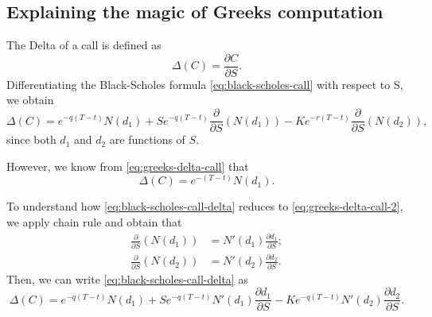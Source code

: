 \subsection{Explaining the magic of Greeks computation}

The Delta of a call is defined as
\begin{equation*}
    \Delta(C) = \frac{\partial C}{\partial S}.
\end{equation*}
Differentiating the Black-Scholes formula \eqref{eq:black-scholes-call} with
    respect to S, we obtain
\begin{equation}
    \Delta(C) = e^{-q(T-t)} N(d_1) + S e^{-q(T-t)}
    \frac{\partial}{\partial S} (N(d_1)) - K e^{-r(T-t)}
    \frac{\partial}{\partial S} (N(d_2)),
    \label{eq:black-scholes-call-delta}
\end{equation}
since both $ d_1 $ and $ d_2 $ are functions of $ S $.

However, we know from \eqref{eq:greeks-delta-call} that
\begin{equation}
    \Delta(C) = e^{-(T-t)} N(d_1).
    \label{eq:greeks-delta-call-2}
\end{equation}

To understand how \eqref{eq:black-scholes-call-delta} reduces to
    \eqref{eq:greeks-delta-call-2}, we apply chain rule and obtain that
\begin{align}
    \frac{\partial}{\partial S}(N(d_1)) &= N'(d_1)
        \frac{\partial d_1}{\partial S}; \\
    \frac{\partial}{\partial S} (N(d_2)) &= N'(d_2)
        \frac{\partial d_2}{\partial S}.
\end{align}
Then, we can write \eqref{eq:black-scholes-call-delta} as
\begin{equation}
    \Delta(C) = e^{-q(T-t)} N(d_1) + S e^{-q(T-t)} N'(d_1)
        \frac{\partial d_1}{\partial S} - K e^{-q(T-t)} N'(d_2)
        \frac{\partial d_2}{\partial S}.
        \label{eq:black-scholes-call-delta-2}
\end{equation}

